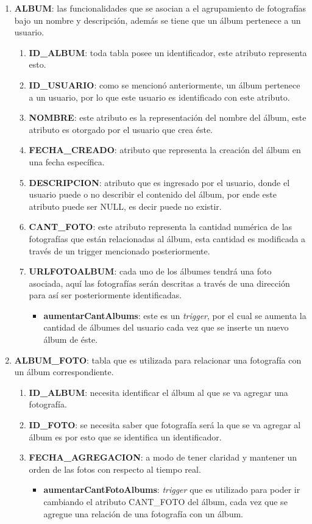\documentclass{memoria}
\begin{document}
\begin{enumerate}
\item \textbf{ALBUM}: las funcionalidades que se asocian a el agrupamiento de fotografías bajo un nombre y descripción, además se tiene que un álbum pertenece a un usuario.

	\begin{enumerate}
	\item \textbf{ID\_ALBUM}: toda tabla posee un identificador, este atributo representa esto.
	\item \textbf{ID\_USUARIO}: como se mencionó anteriormente, un álbum pertenece a un usuario, por lo que este usuario es identificado con este atributo.
	\item \textbf{NOMBRE}: este atributo es la representación del nombre del álbum, este atributo es otorgado por el usuario que crea éste.
	\item \textbf{FECHA\_CREADO}: atributo que representa la creación del álbum en una fecha específica.
	\item \textbf{DESCRIPCION}: atributo que es ingresado por el usuario, donde el usuario puede o no describir el contenido del álbum, por ende este atributo puede ser NULL, es decir puede no existir.
	\item \textbf{CANT\_FOTO}: este atributo representa la cantidad numérica de las fotografías que están relacionadas al álbum, esta cantidad es modificada a través de un trigger mencionado posteriormente.
	\item \textbf{URLFOTOALBUM}: cada uno de los álbumes tendrá una foto asociada, aquí las fotografías serán descritas a través de una dirección para así ser posteriormente identificadas.
		\begin{itemize}
		\item \textbf{aumentarCantAlbums}: este es un \textsl{trigger}, por el cual se aumenta la cantidad de álbumes del usuario cada vez que se inserte un nuevo álbum de éste.
		\end{itemize}
	\end{enumerate}
	
\item \textbf{ALBUM\_FOTO}: tabla que es utilizada para relacionar una fotografía con un álbum correspondiente.

	\begin{enumerate}
	\item \textbf{ID\_ALBUM}: necesita identificar el álbum al que se va agregar una fotografía.
	\item \textbf{ID\_FOTO}: se necesita saber que fotografía será la que se va agregar al álbum es por esto que se identifica un identificador.
	\item \textbf{FECHA\_AGREGACION}: a modo de tener claridad y mantener un orden de las fotos con respecto al tiempo real.
		\begin{itemize}
		\item \textbf{aumentarCantFotoAlbums}: \textsl{trigger} que es utilizado para poder ir cambiando el atributo CANT\_FOTO del álbum, cada vez que se agregue una relación de una fotografía con un álbum. 
		\end{itemize}
	\end{enumerate}


\end{enumerate}
\end{document}
